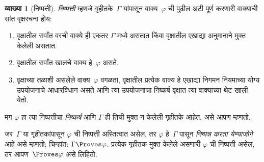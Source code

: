 \documentclass[11pt,a4paper,openany]{book}
\theoremstyle{definition}
\newtheorem{defn}{व्याख्या}[section]
\begin{document}
\begin{defn}[निष्पत्ती]
\emph{निष्पत्ती} म्हणजे गृहीतके~$\Gamma$
यांपासून वाक्य~$\varphi$ ची पुढील अटी पूर्ण करणारी वाक्यांची
सांत वृक्षरचना होय:
\begin{enumerate}
\item वृक्षातील सर्वांत वरची वाक्ये ही एकतर $\Gamma$ मध्ये असतात
  किंवा वृक्षातील एखाद्या अनुमानाने मुक्त केलेली असतात.
\item वृक्षातील सर्वांत खालचे वाक्य हे~$\varphi$ असते.
\item वृक्षाच्या तळाशी असलेले वाक्य~$\varphi$ वगळता, वृक्षातील प्रत्येक
  वाक्य हे एखाद्या निगमन नियमाच्या योग्य उपयोजनाचे आधारविधान असते
  आणि त्या उपयोजनाचा निष्कर्ष वृक्षात त्या वाक्याच्या थेट खाली येतो.
\end{enumerate}
मग $\varphi$ हा त्या निष्पत्तीचा \emph{निष्कर्ष} आणि $\Gamma$ ही तिची
मुक्त न केलेली गृहीतके आहेत, असे आपण म्हणतो.

जर~$\Gamma$ या गृहीतकांपासून $\varphi$ ची निष्पत्ती अस्तित्वात असेल, तर
$\varphi$ हे~$\Gamma$ पासून \emph{निष्पन्न करता येण्याजोगे} आहे असे म्हणतो; चिन्हांत:
$\Gamma \Proves \varphi$. प्रत्येक गृहीतक मुक्त केलेले असणारी $\varphi$
ची निष्पत्ती असेल, तर आपण~$\Proves \varphi$ असे लिहितो.
\end{defn}
\end{document}
